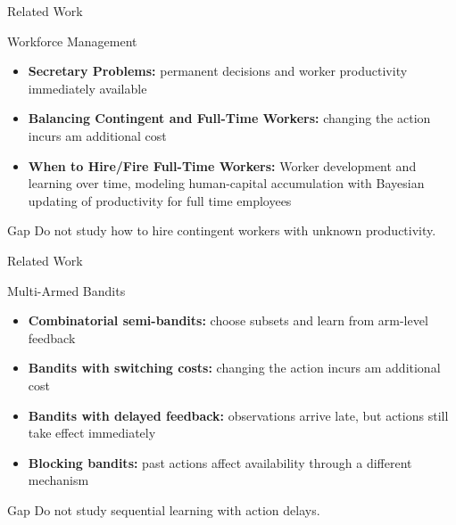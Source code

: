 \documentclass[10pt,aspectratio=169]{beamer}
\begin{document}
\begin{frame}{Related Work}
    \begin{block}{Workforce Management}
    \begin{itemize}
        \item \textbf{Secretary Problems:} permanent decisions and worker productivity immediately available \parencite{dynkin1963optimal, ferguson1989who}
        \item \textbf{Balancing Contingent and Full-Time Workers:} changing the action incurs am additional cost \parencite{king2016dynamic, dong2020managing, berenguer2024managing, lobel2024frontiers}
        \item \textbf{When to Hire/Fire Full-Time Workers:} Worker development and learning over time, modeling human-capital accumulation with Bayesian updating of productivity for full time employees \parencite{arlotto2014optimal}
    \end{itemize}
    \end{block}

    \begin{alertblock}{Gap}
        Do not study how to hire contingent workers with \alert{unknown productivity}.
    \end{alertblock}
\end{frame}

\begin{frame}{Related Work}
    \begin{block}{Multi-Armed Bandits}
    \begin{itemize}
        \item \textbf{Combinatorial semi-bandits:} choose subsets and learn from arm-level feedback \parencite{kveton2014matroid,kveton2015tight}
        \item \textbf{Bandits with switching costs:} changing the action incurs am additional cost \parencite{agrawal1990switching}
        \item \textbf{Bandits with delayed feedback:} observations arrive late, but actions still take effect immediately \parencite{joulani2013online}
        \item \textbf{Blocking bandits:} past actions affect availability through a different mechanism \parencite{basu2019blocking,atsidakou2021combinatorial}
    \end{itemize}
    \end{block}

    \begin{alertblock}{Gap}
        Do not study sequential learning with \alert{action delays}.
    \end{alertblock}
\end{frame}
\end{document}
